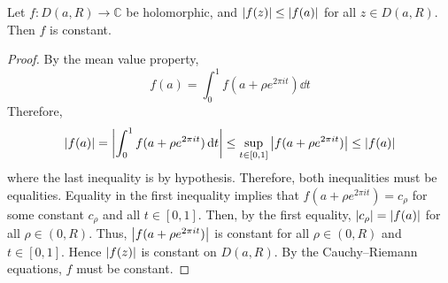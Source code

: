 \begin{theorem}
	Let \( f \colon D(a,R) \to \mathbb C \) be holomorphic, and \( \abs{f(z)} \leq \abs{f(a)} \) for all \( z \in D(a,R) \).
	Then \( f \) is constant.
\end{theorem}
\begin{proof}
	By the mean value property,
	\[
		f(a) = \int_0^1 f(a+\rho e^{2 \pi i t}) \dd{t}
	\]
	Therefore,
	\[
		\abs{f(a)} = \abs{\int_0^1 f(a + \rho e^{2 \pi i t}) \dd{t}} \leq \sup_{t \in [0,1]} \abs{f(a+\rho e^{2 \pi i t})} \leq \abs{f(a)}
	\]
	where the last inequality is by hypothesis.
	Therefore, both inequalities must be equalities.
	Equality in the first inequality implies that \( f(a+\rho e^{2 \pi i t}) = c_\rho \) for some constant \( c_\rho \) and all \( t \in [0,1] \).
	Then, by the first equality, \( \abs{c_\rho} = \abs{f(a)} \) for all \( \rho \in (0,R) \).
	Thus, \( \abs{f(a+\rho e^{2 \pi i t})} \) is constant for all \( \rho \in (0,R) \) and \( t \in [0,1] \).
	Hence \( \abs{f(z)} \) is constant on \( D(a,R) \).
	By the Cauchy--Riemann equations, \( f \) must be constant.
\end{proof}

